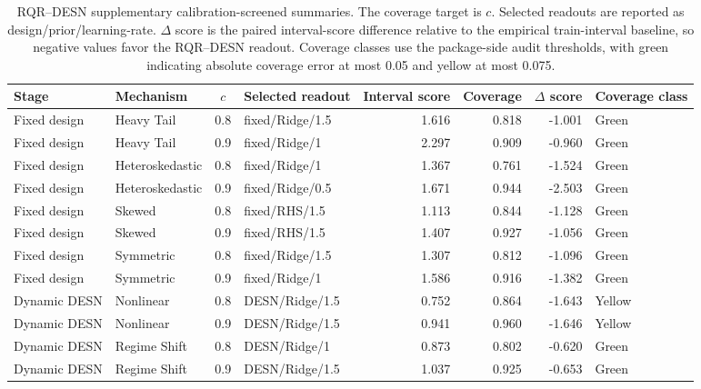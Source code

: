 \begin{table}[!htbp]
\centering
\begingroup
\TableStyle
\begin{tabular}{@{}llclrrrl@{}}
\toprule
Stage & Mechanism & $c$ & Selected readout & Interval score & Coverage & $\Delta$ score & Coverage class \\
\midrule
Fixed design & Heavy Tail & 0.8 & fixed/Ridge/1.5 & 1.616 & 0.818 & -1.001 & Green \\
Fixed design & Heavy Tail & 0.9 & fixed/Ridge/1 & 2.297 & 0.909 & -0.960 & Green \\
Fixed design & Heteroskedastic & 0.8 & fixed/Ridge/1 & 1.367 & 0.761 & -1.524 & Green \\
Fixed design & Heteroskedastic & 0.9 & fixed/Ridge/0.5 & 1.671 & 0.944 & -2.503 & Green \\
Fixed design & Skewed & 0.8 & fixed/RHS/1.5 & 1.113 & 0.844 & -1.128 & Green \\
Fixed design & Skewed & 0.9 & fixed/RHS/1.5 & 1.407 & 0.927 & -1.056 & Green \\
Fixed design & Symmetric & 0.8 & fixed/Ridge/1.5 & 1.307 & 0.812 & -1.096 & Green \\
Fixed design & Symmetric & 0.9 & fixed/Ridge/1 & 1.586 & 0.916 & -1.382 & Green \\
Dynamic DESN & Nonlinear & 0.8 & DESN/Ridge/1.5 & 0.752 & 0.864 & -1.643 & Yellow \\
Dynamic DESN & Nonlinear & 0.9 & DESN/Ridge/1.5 & 0.941 & 0.960 & -1.646 & Yellow \\
Dynamic DESN & Regime Shift & 0.8 & DESN/Ridge/1 & 0.873 & 0.802 & -0.620 & Green \\
Dynamic DESN & Regime Shift & 0.9 & DESN/Ridge/1.5 & 1.037 & 0.925 & -0.653 & Green \\
\bottomrule
\end{tabular}
\endgroup
\caption{RQR--DESN supplementary calibration-screened summaries. The coverage target is $c$. Selected readouts are reported as design/prior/learning-rate. $\Delta$ score is the paired interval-score difference relative to the empirical train-interval baseline, so negative values favor the RQR--DESN readout. Coverage classes use the package-side audit thresholds, with green indicating absolute coverage error at most 0.05 and yellow at most 0.075.}
\label{tab:rqr-desn-calibration-screened}
\end{table}

